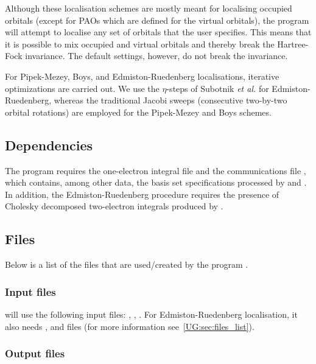 Although these localisation schemes are mostly meant for localising occupied
orbitals (except for PAOs which are defined for the virtual orbitals), the
 program will attempt to localise any set of orbitals
that the user specifies. This means that it is possible to mix
occupied and virtual orbitals and thereby break the Hartree-Fock
invariance. The default settings, however, do not break the invariance.

For Pipek-Mezey, Boys, and Edmiston-Ruedenberg localisations, iterative
optimizations are carried out. We use
the $\eta$-steps of Subotnik {\em et al.}\cite{Subotnik:04} for
Edmiston-Ruedenberg, whereas the traditional Jacobi sweeps (consecutive
two-by-two orbital rotations)\cite{Pipek:89,Subotnik:04}
are employed for the Pipek-Mezey and Boys schemes.

\subsection{Dependencies}
\label{UG:sec:localisation_dependencies}
The  program requires the one-{}electron integral file
 and the communications file ,
which contains, among other data, the
basis set specifications processed by  and .
In addition, the Edmiston-Ruedenberg procedure requires the presence
of Cholesky decomposed two-electron integrals produced by .

\subsection{Files}
\label{UG:sec:localisation_files}

Below is a list of the files that are used/created by the program
.

\subsubsection{Input files}
 will use the following input
files: , , .
For Edmiston-Ruedenberg localisation,
it also needs ,  and  files
(for more information see~\ref{UG:sec:files_list}).

\subsubsection{Output files}

